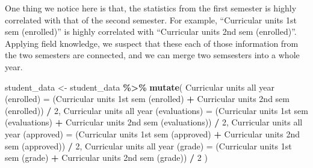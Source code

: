 \documentclass[
]{article}
\newenvironment{Shaded}{\begin{snugshade}}{\end{snugshade}}
\newcommand{\AttributeTok}[1]{\textcolor[rgb]{0.13,0.29,0.53}{#1}}
\newcommand{\DecValTok}[1]{\textcolor[rgb]{0.00,0.00,0.81}{#1}}
\newcommand{\FunctionTok}[1]{\textcolor[rgb]{0.13,0.29,0.53}{\textbf{#1}}}
\newcommand{\NormalTok}[1]{#1}
\newcommand{\OtherTok}[1]{\textcolor[rgb]{0.56,0.35,0.01}{#1}}
\newcommand{\SpecialCharTok}[1]{\textcolor[rgb]{0.81,0.36,0.00}{\textbf{#1}}}
\newcommand{\StringTok}[1]{\textcolor[rgb]{0.31,0.60,0.02}{#1}}
\begin{document}
One thing we notice here is that, the statistics from the first semester
is highly correlated with that of the second semester. For example,
``Curricular units 1st sem (enrolled)'' is highly correlated with
``Curricular units 2nd sem (enrolled)''. Applying field knowledge, we
suspect that these each of those information from the two semesters are
connected, and we can merge two semsesters into a whole year.

\begin{Shaded}
\begin{Highlighting}[]
\NormalTok{student\_data }\OtherTok{\textless{}{-}}\NormalTok{ student\_data }\SpecialCharTok{\%\textgreater{}\%}
  \FunctionTok{mutate}\NormalTok{(}
    \StringTok{\textasciigrave{}}\AttributeTok{Curricular units all year (enrolled)}\StringTok{\textasciigrave{}} \OtherTok{=}\NormalTok{ (}\StringTok{\textasciigrave{}}\AttributeTok{Curricular units 1st sem (enrolled)}\StringTok{\textasciigrave{}} \SpecialCharTok{+} \StringTok{\textasciigrave{}}\AttributeTok{Curricular units 2nd sem (enrolled)}\StringTok{\textasciigrave{}}\NormalTok{) }\SpecialCharTok{/} \DecValTok{2}\NormalTok{,}
    \StringTok{\textasciigrave{}}\AttributeTok{Curricular units all year (evaluations)}\StringTok{\textasciigrave{}} \OtherTok{=}\NormalTok{ (}\StringTok{\textasciigrave{}}\AttributeTok{Curricular units 1st sem (evaluations)}\StringTok{\textasciigrave{}} \SpecialCharTok{+} \StringTok{\textasciigrave{}}\AttributeTok{Curricular units 2nd sem (evaluations)}\StringTok{\textasciigrave{}}\NormalTok{) }\SpecialCharTok{/} \DecValTok{2}\NormalTok{,}
    \StringTok{\textasciigrave{}}\AttributeTok{Curricular units all year (approved)}\StringTok{\textasciigrave{}} \OtherTok{=}\NormalTok{ (}\StringTok{\textasciigrave{}}\AttributeTok{Curricular units 1st sem (approved)}\StringTok{\textasciigrave{}} \SpecialCharTok{+} \StringTok{\textasciigrave{}}\AttributeTok{Curricular units 2nd sem (approved)}\StringTok{\textasciigrave{}}\NormalTok{) }\SpecialCharTok{/} \DecValTok{2}\NormalTok{,}
    \StringTok{\textasciigrave{}}\AttributeTok{Curricular units all year (grade)}\StringTok{\textasciigrave{}} \OtherTok{=}\NormalTok{ (}\StringTok{\textasciigrave{}}\AttributeTok{Curricular units 1st sem (grade)}\StringTok{\textasciigrave{}} \SpecialCharTok{+} \StringTok{\textasciigrave{}}\AttributeTok{Curricular units 2nd sem (grade)}\StringTok{\textasciigrave{}}\NormalTok{) }\SpecialCharTok{/} \DecValTok{2}
\NormalTok{  )}
\end{Highlighting}
\end{Shaded}
\end{document}
